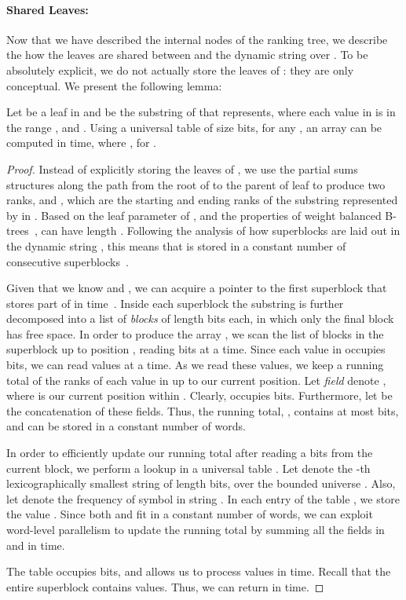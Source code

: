 \documentclass{llncs}
\begin{document}
\paragraph{Shared Leaves:}

Now that we have described the internal nodes of the ranking tree, we
describe the how the leaves are shared between  and the dynamic
string over .  To be absolutely explicit, we do not actually
store the leaves of : they are only conceptual. We present the
following lemma:

\begin{lemma}
\label{lem:leaf-query}
Let  be a leaf in  and  be the substring of  that
 represents, where each value in  is in the range ,
and .  Using a universal table
of size  bits, for any , an array  can be computed in
 time, where , for .
\end{lemma}

\begin{proof}
Instead of explicitly storing the leaves of , we use the partial
sums structures along the path from the root of  to the parent
of leaf  to produce two ranks,  and , which are the
starting and ending ranks of the substring  represented by  in
.  Based on the leaf parameter of , and the properties
of weight balanced B-trees~\cite{AV03},  can have length
.  Following the analysis of how superblocks are
laid out in the dynamic string , this means that  is stored
in a constant number of consecutive superblocks~\cite[Section
  4]{HM10a}.

Given that we know  and , we can acquire a pointer to the
first superblock that stores part of  in 
time~\cite[Lemma 7]{HM10a}.  Inside each superblock the substring is
further decomposed into a list of \emph{blocks} of length  bits each, in which only the final block has free space.
In order to produce the array , we scan the list of blocks in the
superblock up to position , reading  bits at a time.
Since each value in  occupies 
bits, we can read  values at a time.  As we
read these values, we keep a running total of the ranks of each value
in  up to our current position.  Let \emph{field} 
denote , where  is our current position within .
Clearly,  occupies  bits.  Furthermore, let  be the concatenation of these fields.  Thus, the
running total, , contains at most  bits, and can be stored in a constant number
of words.

In order to efficiently update our running total  after reading a
 bits from the current block, we perform a lookup in a
universal table .  Let  denote the -th lexicographically
smallest string of length  bits, over the bounded universe
.  Also, let  denote the frequency of symbol  in string . In each entry of the table , we
store the value .  Since both  and 
fit in a constant number of words, we can exploit word-level
parallelism to update the running total by summing all the fields in
 and  in  time.

The table  occupies  bits, and allows
us to process  values in  time.  Recall
that the entire superblock contains 
values.  Thus, we can return  in  time.
\end{proof}
\end{document}
